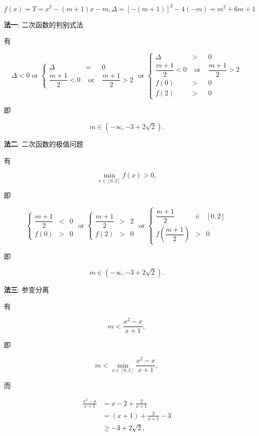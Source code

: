\documentclass[8pt]{article}
\begin{document}
\begin{enumerate}[label=\arabic*.]
\begin{enumerate}[label=(\arabic*)]
					$$f(x)=T=x^2-(m+1)x-m, \Delta = [-(m+1)]^2-4(-m)=m^2+6m+1$$

					\textbf{法一}: 二次函数的判别式法

					有

					$$\Delta < 0 \text{ or } \left\{\begin{array}{rcl}\Delta&=&0\\\dfrac{m+1}{2}<0&\text{ or }&\dfrac{m+1}{2}>2\end{array}\right. \text{ or } \left\{\begin{array}{rcl}\Delta&>&0\\\dfrac{m+1}{2}<0&\text{ or }&\dfrac{m+1}{2}>2\\f(0)&>&0\\f(2)&>&0\end{array}\right. $$

					即

					$$m\in\left(-\infty, -3+2\sqrt{2}\right).$$

					\textbf{法二}: 二次函数的极值问题

					有

					$$\min_{x\in[0, 2]} f(x) > 0,$$

					即

					$$\left\{\begin{array}{rcl}\dfrac{m+1}{2}&<&0\\f(0)&>&0\end{array}\right. \text{ or } \left\{\begin{array}{rcl}\dfrac{m+1}{2}&>&2\\f(2)&>&0\end{array}\right. \text{ or } \left\{\begin{array}{rcl}\dfrac{m+1}{2}&\in&[0,2]\\f\left(\dfrac{m+1}{2}\right)&>&0\end{array}\right. $$

					即

					$$m\in\left(-\infty, -3+2\sqrt{2}\right).$$

					\textbf{法三}: 参变分离

					有

					$$m<\frac{x^2-x}{x+1},$$

					即

					$$m<\min_{x\in[0, 2]} \frac{x^2-x}{x+1},$$

					而

					\begin{align*}
						\frac{x^2-x}{x+1} &= x - 2 + \frac{2}{x+1}\\
						&= (x+1) + \frac{2}{x+1} - 3\\
						&\geq -3 + 2\sqrt{2},
					\end{align*}


\end{enumerate}
\end{enumerate}
\end{document}
